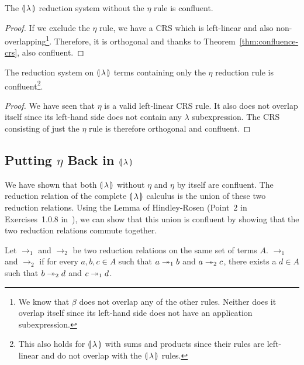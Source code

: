 \begin{lemma}\label{lem:confluence-int}

  The $\llparenthesis \, \lambda \, \rrparenthesis$ reduction system without the $\eta$ rule is
  confluent.
\end{lemma}

\begin{proof}
  If we exclude the $\eta$ rule, we have a CRS which is left-linear and
  also non-overlapping\footnote{We know that $\beta$ does not overlap
    any of the other rules. Neither does it overlap itself since its
    left-hand side does not have an application subexpression.}. Therefore,
  it is orthogonal and thanks to Theorem~\ref{thm:confluence-crs}, also
  confluent.
\end{proof}

\begin{lemma}\label{lem:confluence-eta}

  The reduction system on $\llparenthesis \, \lambda \, \rrparenthesis$ terms containing only the
  $\eta$ reduction rule is confluent\footnote{This also holds for
    $\llparenthesis \, \lambda \, \rrparenthesis$ with sums and products since their rules are
    left-linear and do not overlap with the $\llparenthesis \, \lambda \, \rrparenthesis$ rules.}.
\end{lemma}

\begin{proof}
  We have seen that $\eta$ is a valid left-linear CRS rule. It also
  does not overlap itself since its left-hand side does not contain any
  $\lambda$ subexpression. The CRS consisting of just the $\eta$ rule
  is therefore orthogonal and confluent.
\end{proof}


\subsection{Putting \texorpdfstring{$\eta$}{eta} Back in
  \texorpdfstring{$\llparenthesis \, \lambda \, \rrparenthesis$}{Our Calculus}}
\label{ssec:confluence-eta}

We have shown that both $\llparenthesis \, \lambda \, \rrparenthesis$ without $\eta$ and
$\eta$ by itself are confluent. The reduction relation of the complete
$\llparenthesis \, \lambda \, \rrparenthesis$ calculus is the union of these two reduction
relations. Using the Lemma of Hindley-Rosen (Point~2 in Exercises~1.0.8
in~\cite{klop1992term}), we can show that this union is confluent by
showing that the two reduction relations commute together.

\begin{definition}
  Let $\to_1$ and $\to_2$ be two reduction relations on the same set of
  terms $A$. $\to_1$ and $\to_2$  if for every $a,b,c \in A$
  such that $a \twoheadrightarrow_1 b$ and $a \twoheadrightarrow_2 c$, there exists a $d \in A$ such
  that $b \twoheadrightarrow_2 d$ and $c \twoheadrightarrow_1 d$.
\end{definition}

